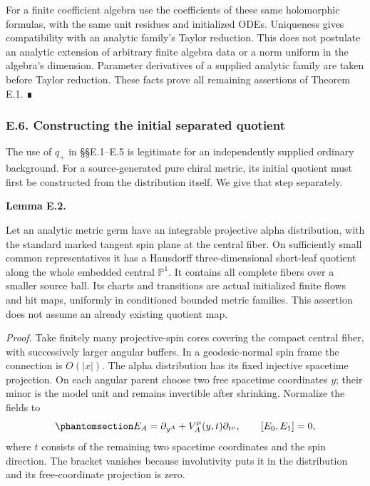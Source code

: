 \documentclass[
  english,
  11pt,
  reqno]{amsart}
\makeatletter
\newcommand{\pandocstatementheading}[1]{%
  \par\addpenalty{\@beginparpenalty}%
  \addvspace{.5\baselineskip plus .2\baselineskip minus .2\baselineskip}%
  {\normalfont\bfseries #1\par}%
  \nobreak\@afterindenttrue\@afterheading
}
\makeatother
\begin{document}
For a finite coefficient algebra use the coefficients of these same
holomorphic formulas, with the same unit residues and initialized ODEs.
Uniqueness gives compatibility with an analytic family's Taylor
reduction. This does not postulate an analytic extension of arbitrary
finite algebra data or a norm uniform in the algebra's dimension.
Parameter derivatives of a supplied analytic family are taken before
Taylor reduction. These facts prove all remaining assertions of Theorem
E.1. ∎

\protect{}\label{sec:gg-initial-alpha-quotient}

\subsubsection{E.6. Constructing the initial separated
quotient}\label{e.6.-constructing-the-initial-separated-quotient}

The use of \(q_+\) in §§E.1--E.5 is legitimate for an independently
supplied ordinary background. For a source-generated pure chiral metric,
its initial quotient must first be constructed from the distribution
itself. We give that step separately.

\pandocstatementheading{\protect{}\label{lem:gg-initial-alpha-quotient}Lemma E.2.}

Let an analytic metric germ have an integrable projective alpha
distribution, with the standard marked tangent spin plane at the central
fiber. On sufficiently small common representatives it has a Hausdorff
three-dimensional short-leaf quotient along the whole embedded central
\(\mathbb P^1\). It contains all complete fibers over a smaller source
ball. Its charts and transitions are actual initialized finite flows and
hit maps, uniformly in conditioned bounded metric families. This
assertion does not assume an already existing quotient map.

\emph{Proof.} Take finitely many projective-spin cores covering the
compact central fiber, with successively larger angular buffers. In a
geodesic-normal spin frame the connection is \(O(|x|)\). The alpha
distribution has its fixed injective spacetime projection. On each
angular parent choose two free spacetime coordinates \(y\); their minor
is the model unit and remains invertible after shrinking. Normalize the
fields to
\begin{equation}\protect\phantomsection\label{eq:gg-initial-quotient-commuting-fields}{
 E_A=\partial_{y^A}
        +V_A^\mu(y,t)\partial_{t^\mu},\qquad [E_0,E_1]=0,
}\end{equation} where \(t\) consists of the remaining two spacetime
coordinates and the spin direction. The bracket vanishes because
involutivity puts it in the distribution and its free-coordinate
projection is zero.
\end{document}
